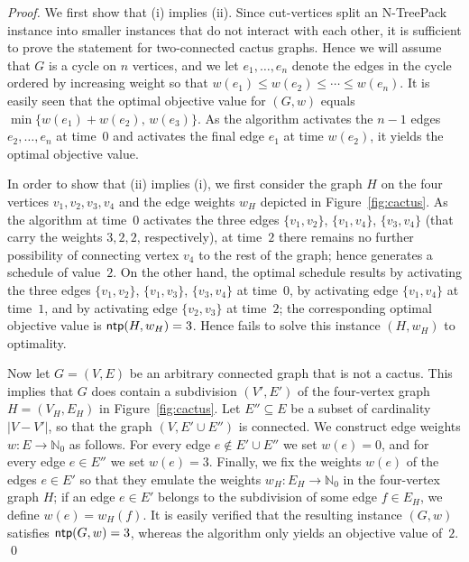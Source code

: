 \documentclass[runningheads]{llncs}
\newcommand{\NN}{\mathbb{N}}
\newcommand{\xxxNTP}{{\sc N-TreePack}}
\DeclareMathOperator{\ntp}{\text{\sf ntp}}
\newcommand{\greedy}{\text{\sf Greedy}}
\begin{document}
\begin{proof}
We first show that (i) implies (ii).
Since cut-vertices split an {\xxxNTP} instance into smaller instances that do not interact 
with each other, it is sufficient to prove the statement for two-connected cactus graphs.
Hence we will assume that $G$ is a cycle on $n$ vertices, and we let $e_1,\ldots,e_n$ 
denote the edges in the cycle ordered by increasing weight so that 
$w(e_1)\le w(e_2)\le\cdots\le w(e_n)$.
It is easily seen that the optimal objective value for $(G,w)$ equals 
$\min\{w(e_1)+w(e_2),\,w(e_3)\}$.
As the {\greedy} algorithm activates the $n-1$ edges $e_2,\ldots,e_n$ at time~$0$ and 
activates the final edge $e_1$ at time $w(e_2)$, it yields the optimal objective value.

In order to show that (ii) implies (i), we first consider the graph $H$ on the four
vertices $v_1,v_2,v_3,v_4$ and the edge weights $w_H$ depicted in Figure~\ref{fig:cactus}.
As the {\greedy} algorithm at time~$0$ activates the three edges $\{v_1,v_2\}$, $\{v_1,v_4\}$, 
$\{v_3,v_4\}$ (that carry the weights $3,2,2$, respectively), at time~$2$ there remains no 
further possibility of connecting vertex $v_4$ to the rest of the graph; hence {\greedy} 
generates a schedule of value~$2$.
On the other hand, the optimal schedule results by activating the three edges $\{v_1,v_2\}$, 
$\{v_1,v_3\}$, $\{v_3,v_4\}$ at time~$0$, by activating edge $\{v_1,v_4\}$ at time~$1$,
and by activating edge $\{v_2,v_3\}$ at time~$2$; the corresponding optimal objective
value is $\ntp(H,w_H)=3$.
Hence {\greedy} fails to solve this instance $(H,w_H)$ to optimality.

Now let $G=(V,E)$ be an arbitrary connected graph that is not a cactus. 
This implies that $G$ does contain a subdivision $(V',E')$ of the four-vertex 
graph $H=(V_H,E_H)$ in Figure~\ref{fig:cactus}.
Let $E''\subseteq E$ be a subset of cardinality $|V-V'|$, so that the graph $(V,E'\cup E'')$
is connected.
We construct edge weights $w:E\to\NN_0$ as follows.
For every edge $e\notin E'\cup E''$ we set $w(e)=0$, and
for every edge $e\in E''$ we set $w(e)=3$.
Finally, we fix the weights $w(e)$ of the edges $e\in E'$ so that they emulate the 
weights $w_H:E_H\to\NN_0$ in the four-vertex graph $H$; if an edge $e\in E'$ belongs to the 
subdivision of some edge $f\in E_H$, we define $w(e)=w_H(f)$.
It is easily verified that the resulting instance $(G,w)$ satisfies $\ntp(G,w)=3$,
whereas the {\greedy} algorithm only yields an objective value of~$2$.
\qed
\end{proof}
\end{document}
